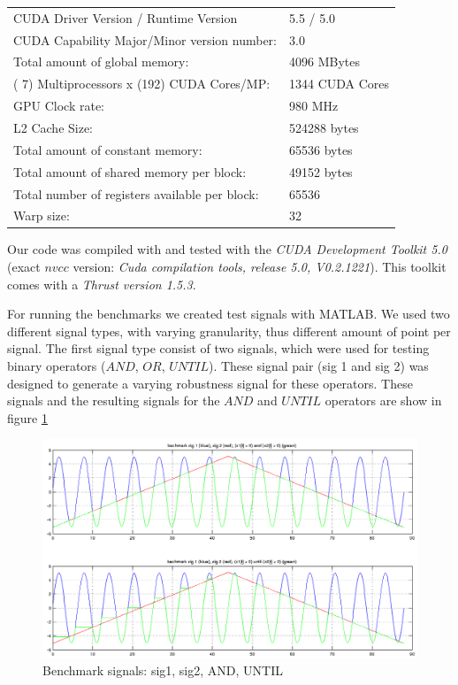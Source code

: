 \documentclass[a4paper,10pt]{article}
\begin{document}
\begin{center}
	\begin{tabular}{ll}
      CUDA Driver Version / Runtime Version          & 5.5 / 5.0 \\
      CUDA Capability Major/Minor version number:    & 3.0 \\
      Total amount of global memory:                 & 4096 MBytes \\
      ( 7) Multiprocessors x (192) CUDA Cores/MP:    & 1344 CUDA Cores \\
      GPU Clock rate:                                & 980 MHz \\
      L2 Cache Size:                                 & 524288 bytes\\
      Total amount of constant memory:               & 65536 bytes \\
      Total amount of shared memory per block:       & 49152 bytes \\
      Total number of registers available per block: & 65536 \\
      Warp size:                                     & 32 \\
	\end{tabular}
	\label{tab: GPU specifications}
\end{center}

Our code was compiled with and tested with the {\it CUDA Development Toolkit 5.0} (exact $nvcc$ version: {\it Cuda compilation tools, release 5.0, V0.2.1221}). This toolkit comes with a {\it Thrust version 1.5.3}.

For running the benchmarks we created test signals with MATLAB. We used two different signal types, with varying granularity, thus different amount of point per signal. 
The first signal type consist of two signals, which were used for testing binary operators ($AND$, $OR$, $UNTIL$). These signal pair (sig 1 and sig 2) was designed to generate a varying robustness signal for these operators.
These signals and the resulting signals for the $AND$ and $UNTIL$ operators are show in figure \ref{fig:sig1_sig2_and_until}

\begin{figure}[H]
    \includegraphics[scale=0.3]{bm_sig1_and_until.png}
    \caption{
        \label{fig:sig1_sig2_and_until}
        Benchmark signals: sig1, sig2, AND, UNTIL}
\end{figure} 
   
\end{document}
